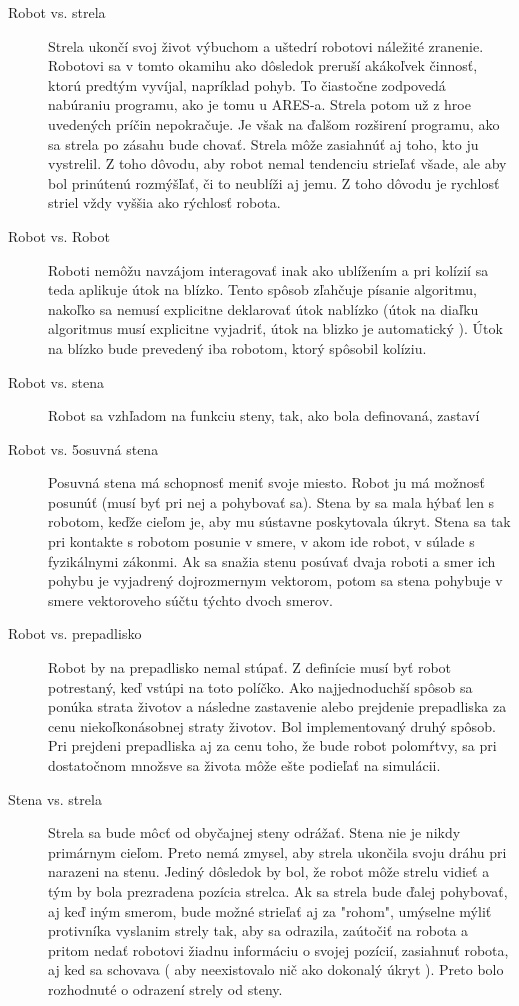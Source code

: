 \begin{description}
\item [Robot vs. strela] Strela ukončí svoj život výbuchom a uštedrí robotovi náležité zranenie. Robotovi sa v tomto okamihu ako dôsledok preruší akákoľvek činnosť, ktorú predtým vyvíjal, napríklad pohyb. To čiastočne zodpovedá nabúraniu programu, ako je tomu u ARES-a. Strela potom už z hroe uvedených príčin nepokračuje. Je však na ďalšom rozširení programu, ako sa strela po zásahu bude chovať. Strela môže zasiahnúť aj toho, kto ju vystrelil. Z toho dôvodu, aby robot nemal tendenciu strieľať všade, ale aby bol prinútenú rozmýšľať, či to neublíži aj jemu. Z toho dôvodu je rychlosť striel vždy vyššia ako rýchlosť robota.%
\item [Robot vs. Robot] Roboti nemôžu navzájom interagovať inak ako ublížením a pri kolízií sa teda aplikuje útok na blízko. Tento spôsob zľahčuje písanie algoritmu, nakoľko sa nemusí explicitne deklarovať útok nablízko  (útok na diaľku algoritmus musí explicitne vyjadriť, útok na blizko je automatický ). Útok na blízko bude prevedený iba robotom, ktorý spôsobil kolíziu. %
\item [Robot vs. stena] Robot sa vzhľadom na funkciu steny, tak, ako bola definovaná, zastaví
\item [Robot vs. 5osuvná stena ] Posuvná stena má schopnosť meniť svoje miesto. Robot ju má možnosť posunúť (musí byť pri nej a pohybovať sa). Stena by sa mala hýbať len s robotom, keďže cieľom je, aby mu sústavne poskytovala úkryt. Stena sa tak pri kontakte s robotom posunie v smere, v akom ide robot, v súlade s fyzikálnymi zákonmi. Ak sa snažia stenu posúvať dvaja roboti a smer ich pohybu je vyjadrený dojrozmernym vektorom, potom sa stena pohybuje v smere vektoroveho súčtu týchto dvoch smerov.
\item[Robot vs. prepadlisko] Robot by na prepadlisko nemal stúpať. Z definície musí byť robot potrestaný, keď vstúpi na toto políčko. Ako najjednoduchší spôsob sa ponúka strata životov a následne zastavenie alebo prejdenie prepadliska za cenu niekoľkonásobnej straty životov. Bol implementovaný druhý spôsob. Pri prejdeni prepadliska aj za cenu toho, že bude robot polomŕtvy, sa pri dostatočnom množsve sa života môže ešte podieľať na simulácii.
\item [Stena vs. strela] Strela sa  bude môcť od obyčajnej steny odrážať. Stena nie je nikdy primárnym cieľom. Preto nemá zmysel, aby strela ukončila svoju dráhu pri narazeni na stenu. Jediný dôsledok by bol, že robot môže strelu vidieť a tým by bola prezradena pozícia strelca. Ak sa strela bude ďalej pohybovať, aj keď iným smerom, bude možné strieľať aj za "rohom", umýselne mýliť protivníka vyslanim strely tak, aby sa odrazila, zaútočiť na robota a pritom nedať robotovi žiadnu informáciu o svojej pozícií, zasiahnuť robota, aj ked sa schovava ( aby neexistovalo nič ako dokonalý úkryt ). Preto bolo rozhodnuté o odrazení strely od steny. 

\end{description}
